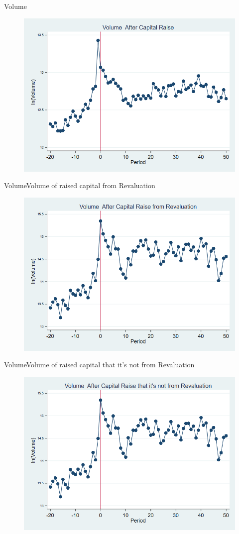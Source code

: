 \documentclass{beamer}
\begin{document}
	\begin{frame}{Volume}
		\begin{figure}
			\centering
			\includegraphics[width=0.7\linewidth]{Output/volume.png}
			\label{fig:volume}
		\end{figure}
	\end{frame}
	
	
	\begin{frame}{Volume}{Volume of raised capital from Revaluation}
		\begin{figure}
			\centering
			\includegraphics[width=0.7\linewidth]{Output/volume_Revaluation.png}
			\label{fig:volumerevaluation}
		\end{figure}
	\end{frame}
	
	
	\begin{frame}{Volume}{Volume of raised capital that it's not from Revaluation}
		\begin{figure}
			\centering
			\includegraphics[width=0.7\linewidth]{Output/volume_NoRevaluation.png}
			\label{fig:volumenorevaluation}
		\end{figure}
	\end{frame}
	
\end{document}

